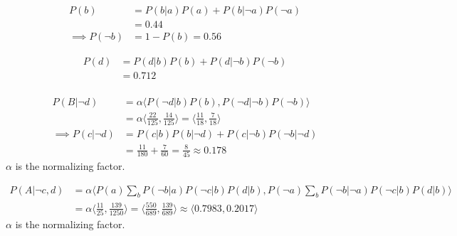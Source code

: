 \documentclass[10pt, a4paper, english]{../Template/NTNUoving}
\begin{document}
\begin{oppgave}

    \begin{punkt}
        \begin{align*}
            P(b) &=
            P(b|a)P(a)+P(b|\neg a)P(\neg a) \\
            &= 0.44 \\
            \implies P(\neg b) &= 1-P(b) = 0.56
        \end{align*}
    \end{punkt}

     \begin{punkt}
        \begin{align*}
            P(d) &=
            P(d|b)P(b)+P(d|\neg b)P(\neg b) \\
            &= 0.712 \\
        \end{align*}
     \end{punkt}

    \begin{punkt}
        \begin{align*}
            P(B | \neg d)
            &= \alpha \langle P(\neg d|b)P(b), P(\neg d | \neg b)P(\neg b) \rangle \\
            &= \alpha \langle \frac{22}{125}, \frac{14}{125} \rangle = \langle \frac{11}{18}, \frac{7}{18}\rangle \\
            \implies P(c|\neg d) &= P(c|b)P(b|\neg d) +  P(c|\neg b)P(\neg b|\neg d) \\
            &= \frac{11}{180} + \frac{7}{60} = \frac{8}{45} \approx 0.178
        \end{align*}
        $\alpha$ is the normalizing factor.
    \end{punkt}

     \begin{punkt}
        \begin{align*}
            P(A | \neg c, d)
            &= \alpha \langle P(a)\sum_b P(\neg b|a)P(\neg c |b) P(d|b), P(\neg a)\sum_b P(\neg b|\neg a)P(\neg c |b) P(d|b) \rangle \\
            &= \alpha \langle \frac{11}{25}, \frac{139}{1250} \rangle = \langle \frac{550}{689}, \frac{139}{689} \rangle \approx \langle 0.7983, 0.2017 \rangle
        \end{align*}
        $\alpha$ is the normalizing factor.
     \end{punkt}
\end{oppgave}
\end{document}
